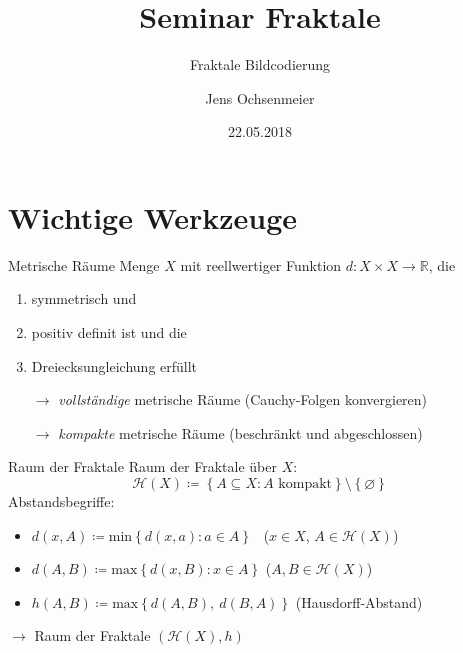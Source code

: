 \documentclass[10pt]{beamer}
\title{Seminar Fraktale}
\subtitle{Fraktale Bildcodierung}
\date{22.05.2018}
\author{Jens Ochsenmeier}
\newcommand{\R}{\mathbb{R}}
\renewcommand{\min}{\text{min}}
\renewcommand{\max}{\text{max}}
\begin{document}
\maketitle


\section{Wichtige Werkzeuge}

%
%
\begin{frame}{Metrische Räume}
  Menge \( X \) mit reellwertiger Funktion \( d: X \times X \to \R \), die
  \begin{enumerate}
    \item \alert{symmetrisch} und
    \item \alert{positiv definit} ist und die
    \item \alert{Dreiecksungleichung} erfüllt 
  \end{enumerate}
  \pause{}
  \begin{itemize}
    \item[\( \to \)] \emph{vollständige} metrische Räume (Cauchy-Folgen konvergieren)
    \pause{}
    \item[\( \to \)] \emph{kompakte} metrische Räume (beschränkt und abgeschlossen)
  \end{itemize}
\end{frame}

%
%
\begin{frame}{Raum der Fraktale}
  Raum der Fraktale über \( X \):
  \begin{equation*}
    \mathcal{H}(X) \coloneqq \left \{ A \subseteq X : A \text{ kompakt} \right \} \setminus \left \{ \varnothing \right \}
  \end{equation*}
  \pause{}
  \alert{Abstandsbegriffe}:
  \begin{itemize}
    \item \( d(x,A) \coloneqq \min\left \{ d(x,a) : a \in A \right \} \) \quad \ (\( x \in X \), \( A \in \mathcal{H}(X) \))
    \item \( d(A,B) \coloneqq \max\left \{ d(x,B) : x \in A \right \} \) \quad (\( A, B \in \mathcal{H}(X) \))
    \pause{}
    \item \( h(A,B) \coloneqq \max\left \{ d(A,B),\ d(B,A) \right \} \) (Hausdorff-Abstand)
  \end{itemize}
  \pause{}
  \( \to \) \alert{Raum der Fraktale} \( (\mathcal{H}(X), h) \)
\end{frame}
\end{document}
